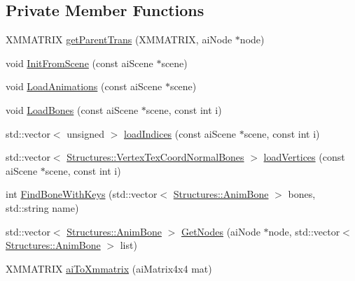 \subsection*{Private Member Functions}
\begin{DoxyCompactItemize}
\item 
X\+M\+M\+A\+T\+R\+IX \mbox{\hyperlink{class_model_loader_aca3f1bef5b2ab890212784626559482c}{get\+Parent\+Trans}} (X\+M\+M\+A\+T\+R\+IX, ai\+Node $\ast$node)
\item 
void \mbox{\hyperlink{class_model_loader_ae809d56b350b003306b484c3bbc1b5e3}{Init\+From\+Scene}} (const ai\+Scene $\ast$scene)
\item 
void \mbox{\hyperlink{class_model_loader_afebdf188f92f87cdcefdee2b4b474727}{Load\+Animations}} (const ai\+Scene $\ast$scene)
\item 
void \mbox{\hyperlink{class_model_loader_a77713e17f817861d8b6b3b166248abe7}{Load\+Bones}} (const ai\+Scene $\ast$scene, const int i)
\item 
std\+::vector$<$ unsigned $>$ \mbox{\hyperlink{class_model_loader_aade9d7c2c0a8a13800700ee3b4b930ef}{load\+Indices}} (const ai\+Scene $\ast$scene, const int i)
\item 
std\+::vector$<$ \mbox{\hyperlink{struct_structures_1_1_vertex_tex_coord_normal_bones}{Structures\+::\+Vertex\+Tex\+Coord\+Normal\+Bones}} $>$ \mbox{\hyperlink{class_model_loader_a90e1f853324d4aee05ba5db140aa974d}{load\+Vertices}} (const ai\+Scene $\ast$scene, const int i)
\item 
int \mbox{\hyperlink{class_model_loader_a5356ad9c0e77c4b5142c1c1400b01048}{Find\+Bone\+With\+Keys}} (std\+::vector$<$ \mbox{\hyperlink{struct_structures_1_1_anim_bone}{Structures\+::\+Anim\+Bone}} $>$ bones, std\+::string name)
\item 
std\+::vector$<$ \mbox{\hyperlink{struct_structures_1_1_anim_bone}{Structures\+::\+Anim\+Bone}} $>$ \mbox{\hyperlink{class_model_loader_afabe255fd413f08ac9939e786f26aee4}{Get\+Nodes}} (ai\+Node $\ast$node, std\+::vector$<$ \mbox{\hyperlink{struct_structures_1_1_anim_bone}{Structures\+::\+Anim\+Bone}} $>$ list)
\item 
X\+M\+M\+A\+T\+R\+IX \mbox{\hyperlink{class_model_loader_ab142e176c572ea327518f01fb2f0630b}{ai\+To\+Xmmatrix}} (ai\+Matrix4x4 mat)
\end{DoxyCompactItemize}
